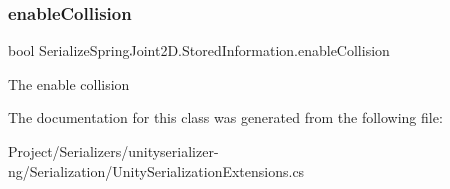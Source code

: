 \subsubsection{\texorpdfstring{enable\+Collision}{enableCollision}}
{\footnotesize\ttfamily bool Serialize\+Spring\+Joint2\+D.\+Stored\+Information.\+enable\+Collision}



The enable collision 



The documentation for this class was generated from the following file\+:\begin{DoxyCompactItemize}
\item 
Project/\+Serializers/unityserializer-\/ng/\+Serialization/Unity\+Serialization\+Extensions.\+cs\end{DoxyCompactItemize}

